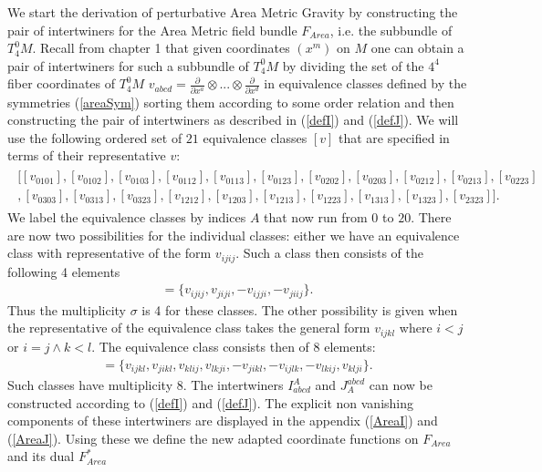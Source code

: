 \documentclass[a4paper,12pt, DIV=14, BCOR=5mm, twoside, headsepline, numbers=noenddot]{scrbook}
\begin{document}
We start the derivation of perturbative Area Metric Gravity by constructing the pair of intertwiners for the Area Metric field bundle $F_{Area}$, i.e. the subbundle of $T^0_4M$. Recall from chapter 1 that given coordinates $(x^m)$ on $M$ one can obtain a pair of intertwiners for such a subbundle of $T^0_4M$ by dividing the set of the $4^4$ fiber coordinates of $T^0_4M$ $v_{abcd}=\frac{\partial}{\partial x^a} \otimes ... \otimes \frac{\partial}{\partial x^d}$ in equivalence classes defined by the symmetries (\ref{areaSym}) sorting them according to some order relation and then constructing the pair of intertwiners as described in (\ref{defI}) and (\ref{defJ}). We will use the following ordered set of $21$ equivalence classes $[v]$ that are specified in terms of their representative $v$:
\begin{align}
\begin{aligned}
    \bigl [ [v_{0101}], [v_{0102}], [v_{0103}], [v_{0112}], [v_{0113}], [v_{0123}], [v_{0202}], [v_{0203}], [v_{0212}], [v_{0213}], [v_{0223}]\\
    , [v_{0303}], [v_{0313}], [v_{0323}], [v_{1212}], [v_{1203}], [v_{1213}], [v_{1223}], [v_{1313}], [v_{1323}], [v_{2323}]  \bigr ].
\end{aligned}
\end{align}
We label the equivalence classes by indices $A$ that now run from $0$ to $20$.
There are now two possibilities for the individual classes: either we have an equivalence class with representative of the form $v_{ijij}$. Such a class then consists of the following 4 elements
\begin{align}
    [v_{ijij}] = \{ v_{ijij}, v_{jiji}, -v_{ijji}, -v_{jiij} \}.
\end{align}
Thus the multiplicity $\sigma$ is 4 for these classes.
The other possibility is given when the representative of the equivalence class takes the general form $v_{ijkl}$ where $i<j$ or $i=j \land k<l$. The equivalence class consists then of 8 elements:
\begin{align}
    [v_{ijkl}] = \{v_{ijkl},v_{jikl}, v_{klij}, v_{lkji}, -v_{jikl}, -v_{ijlk}, -v_{lkij}, v_{klji} \}.
\end{align}
Such classes have multiplicity 8. The intertwiners $I^A_{abcd}$ and $J_A^{abcd}$ can now be constructed according to (\ref{defI}) and (\ref{defJ}). The explicit non vanishing components of these intertwiners are displayed in the appendix (\ref{AreaI}) and (\ref{AreaJ}). Using these we define the new adapted coordinate functions on $F_{Area}$ and its dual $F_{Area}^{\ast}$
\end{document}
